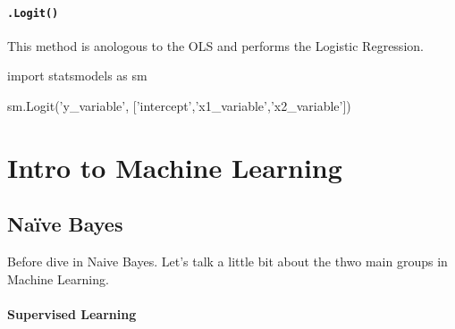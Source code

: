 \documentclass[]{book}
\newenvironment{Shaded}{\begin{snugshade}}{\end{snugshade}}
\newcommand{\StringTok}[1]{\textcolor[rgb]{0.31,0.60,0.02}{#1}}
\newcommand{\ImportTok}[1]{#1}
\newcommand{\NormalTok}[1]{#1}
\begin{document}
\subsubsection{\texorpdfstring{\texttt{.Logit()}}{.Logit()}}\label{logit}

This method is anologous to the OLS and performs the Logistic
Regression.

\begin{Shaded}
\begin{Highlighting}[]
\ImportTok{import}\NormalTok{ statsmodels }\ImportTok{as}\NormalTok{ sm}

\NormalTok{sm.Logit(}\StringTok{'y_variable'}\NormalTok{, [}\StringTok{'intercept'}\NormalTok{,}\StringTok{'x1_variable'}\NormalTok{,}\StringTok{'x2_variable'}\NormalTok{])}
\end{Highlighting}
\end{Shaded}

\chapter{Intro to Machine Learning}\label{intro-to-machine-learning}

\section{Naïve Bayes}\label{naive-bayes}

Before dive in Naive Bayes. Let's talk a little bit about the thwo main
groups in Machine Learning.

\subsubsection*{Supervised Learning}\label{supervised-learning}
\end{document}
